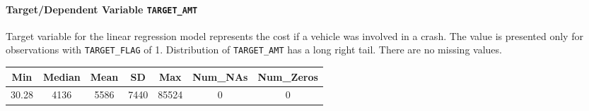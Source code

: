\documentclass[]{article}
\let\oldparagraph\paragraph
\renewcommand{\paragraph}[1]{\oldparagraph{#1}\mbox{}}
\begin{document}
\paragraph{\texorpdfstring{Target/Dependent Variable
\texttt{TARGET\_AMT}}{Target/Dependent Variable TARGET\_AMT}}\label{targetdependent-variable-target_amt}

Target variable for the linear regression model represents the cost if a
vehicle was involved in a crash. The value is presented only for
observations with \texttt{TARGET\_FLAG} of 1. Distribution of
\texttt{TARGET\_AMT} has a long right tail. There are no missing values.

\begin{longtable}[]{@{}ccccccc@{}}
\toprule
\begin{minipage}[b]{0.09\columnwidth}\centering\strut
Min\strut
\end{minipage} & \begin{minipage}[b]{0.10\columnwidth}\centering\strut
Median\strut
\end{minipage} & \begin{minipage}[b]{0.08\columnwidth}\centering\strut
Mean\strut
\end{minipage} & \begin{minipage}[b]{0.08\columnwidth}\centering\strut
SD\strut
\end{minipage} & \begin{minipage}[b]{0.09\columnwidth}\centering\strut
Max\strut
\end{minipage} & \begin{minipage}[b]{0.11\columnwidth}\centering\strut
Num\_NAs\strut
\end{minipage} & \begin{minipage}[b]{0.12\columnwidth}\centering\strut
Num\_Zeros\strut
\end{minipage}\tabularnewline
\midrule
\endhead
\begin{minipage}[t]{0.09\columnwidth}\centering\strut
30.28\strut
\end{minipage} & \begin{minipage}[t]{0.10\columnwidth}\centering\strut
4136\strut
\end{minipage} & \begin{minipage}[t]{0.08\columnwidth}\centering\strut
5586\strut
\end{minipage} & \begin{minipage}[t]{0.08\columnwidth}\centering\strut
7440\strut
\end{minipage} & \begin{minipage}[t]{0.09\columnwidth}\centering\strut
85524\strut
\end{minipage} & \begin{minipage}[t]{0.11\columnwidth}\centering\strut
0\strut
\end{minipage} & \begin{minipage}[t]{0.12\columnwidth}\centering\strut
0\strut
\end{minipage}\tabularnewline
\bottomrule
\end{longtable}
\end{document}
